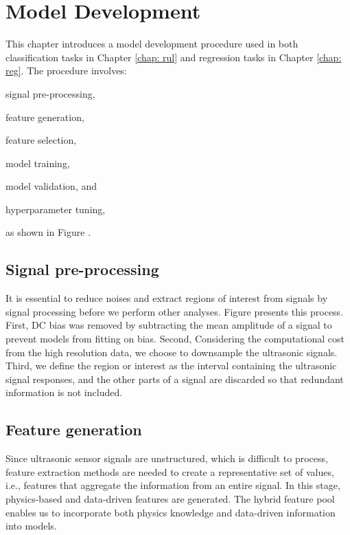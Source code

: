 \chapter{Model Development}
\label{chap: model}

This chapter introduces a model development procedure used in both classification tasks in Chapter \ref{chap: rul} and regression tasks in Chapter \ref{chap: reg}. The procedure involves:
\begin{enumerate*}[label=\itshape\alph*\upshape)]
    \item signal pre-processing,
    \item feature generation,
    \item feature selection,
    \item model training,
    \item model validation, and
    \item hyperparameter tuning,
\end{enumerate*}
as shown in Figure .

\section{Signal pre-processing}
It is essential to reduce noises and extract regions of interest from signals by signal processing before we perform other analyses. Figure presents this process. First, DC bias was removed by subtracting the mean amplitude of a signal to prevent models from fitting on bias. Second, Considering the computational cost from the high resolution data, we choose to downsample the ultrasonic signals. Third, we define the region or interest as the interval containing the ultrasonic signal responses, and the other parts of a signal are discarded so that redundant information is not included.

\section{Feature generation}
Since ultrasonic sensor signals are unstructured, which is difficult to process, feature extraction methods are needed to create a representative set of values, i.e., features that aggregate the information from an entire signal. In this stage, physics-based and data-driven features are generated. The hybrid feature pool enables us to incorporate both physics knowledge and data-driven information into models.

